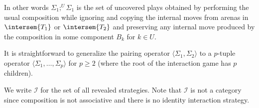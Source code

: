 \begin{definition}
\begin{itemize}[-]
In other words $\Sigma_1 ;^U \Sigma_1$ is the set of uncovered
plays obtained by performing the usual composition while
ignoring and copying the internal moves from arenas in
$\intersem{T_1}$ or $\intersem{T_2}$ and preserving any internal
move produced by the composition in some component $B_k$ for $k
\in U$.
\end{itemize}
\end{definition}

\begin{remark} It is straightforward to generalize the pairing operator $\langle \Sigma_1, \Sigma_2 \rangle$ to a $p$-tuple operator $\langle \Sigma_1, \ldots, \Sigma_p \rangle$ for $p\geq2$ (where the root of the interaction game has $p$ children).
\end{remark}

We write $\mathcal{I}$ for the set of all revealed strategies. Note
that $\mathcal{I}$ is not a category since composition is not
associative and there is no identity interaction strategy.


